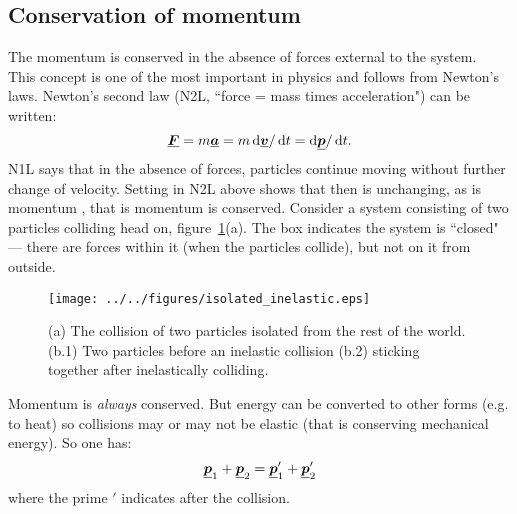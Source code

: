 \subsection{Conservation of momentum}
The momentum is conserved in the absence of forces external to the system.  \\
This concept is one of the most important in physics and follows from Newton's laws.  Newton's second law (N2L, ``force = mass times acceleration") can be written:
\begin{equation*} 
\mathit{\underline{\boldsymbol{F}}} = m \mathit{\underline{\boldsymbol{a}}} = m \operatorname{d}\!\mathit{\underline{\boldsymbol{v}}}/\operatorname{d}\! t = \operatorname{d}\!\mathit{\underline{\boldsymbol{p}}}/\operatorname{d}\! t .
\end{equation*}
N1L says that in the absence of forces, particles continue moving without further change of velocity.  Setting  in N2L above shows that then  is unchanging, as is momentum , that is momentum is conserved.\nll
Consider a system consisting of two particles colliding head on, figure~\ref{fig:isolated_inelastic}(a). The box indicates the system is ``closed" --- there are forces within it (when the particles collide), but not on it from outside.
\begin{figure}[h!]
\centering
\texttt{[image: ../../figures/isolated\_inelastic.eps]}
\caption{(a) The collision of two particles isolated from the rest of the world. (b.1) Two particles before an inelastic collision (b.2) sticking together after inelastically colliding.}\label{fig:isolated_inelastic}
\end{figure}
\nll Momentum is \emph{always} conserved.  But energy can be converted to other forms (e.g. to heat) so collisions may or may not be elastic (that is conserving mechanical energy).  So one has:
\begin{equation*} 
\mathit{\underline{\boldsymbol{p}}}_1 +  \mathit{\underline{\boldsymbol{p}}}_2 = \mathit{\underline{\boldsymbol{p}}}_1'  + \mathit{\underline{\boldsymbol{p}}}_2'
\end{equation*}
where the prime $'$ indicates after the collision.

